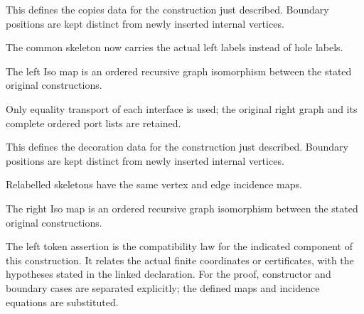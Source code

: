 This defines the copies data for the construction just described. Boundary positions are kept distinct from newly inserted internal vertices.
\par{}

The common skeleton now carries the actual left labels instead of hole labels.
\par{}

The left Iso map is an ordered recursive graph isomorphism between the stated original constructions.
\par{}

Only equality transport of each interface is used; the original right graph and its complete ordered port lists are retained.
\par{}

This defines the decoration data for the construction just described. Boundary positions are kept distinct from newly inserted internal vertices.
\par{}

Relabelled skeletons have the same vertex and edge incidence maps.
\par{}

The right Iso map is an ordered recursive graph isomorphism between the stated original constructions.
\par{}

The left token assertion is the compatibility law for the indicated component of this construction. It relates the actual finite coordinates or certificates, with the hypotheses stated in the linked declaration.
For the proof, constructor and boundary cases are separated explicitly; the defined maps and incidence equations are substituted.
\par{}

